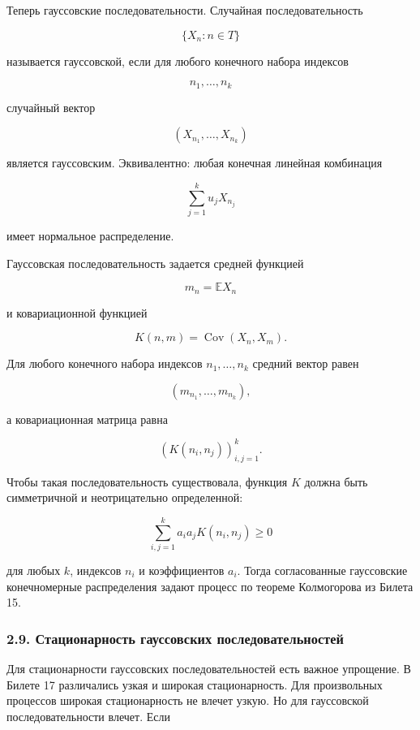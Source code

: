 \documentclass[
  11pt,
  a4paper,
]{article}
\begin{document}
Теперь гауссовские последовательности. Случайная последовательность

\[
\{X_n:n\in T\}
\]

называется гауссовской, если для любого конечного набора индексов

\[
n_1,\ldots,n_k
\]

случайный вектор

\[
(X_{n_1},\ldots,X_{n_k})
\]

является гауссовским. Эквивалентно: любая конечная линейная комбинация

\[
\sum_{j=1}^k u_jX_{n_j}
\]

имеет нормальное распределение.

Гауссовская последовательность задается средней функцией

\[
m_n=\mathbb EX_n
\]

и ковариационной функцией

\[
K(n,m)=\operatorname{Cov}(X_n,X_m).
\]

Для любого конечного набора индексов \(n_1,\ldots,n_k\) средний вектор
равен

\[
(m_{n_1},\ldots,m_{n_k}),
\]

а ковариационная матрица равна

\[
(K(n_i,n_j))_{i,j=1}^k.
\]

Чтобы такая последовательность существовала, функция \(K\) должна быть
симметричной и неотрицательно определенной:

\[
\sum_{i,j=1}^k a_i a_jK(n_i,n_j)\ge0
\]

для любых \(k\), индексов \(n_i\) и коэффициентов \(a_i\). Тогда
согласованные гауссовские конечномерные распределения задают процесс по
теореме Колмогорова из Билета 15.

\subsubsection{2.9. Стационарность гауссовских
последовательностей}\label{ux441ux442ux430ux446ux438ux43eux43dux430ux440ux43dux43eux441ux442ux44c-ux433ux430ux443ux441ux441ux43eux432ux441ux43aux438ux445-ux43fux43eux441ux43bux435ux434ux43eux432ux430ux442ux435ux43bux44cux43dux43eux441ux442ux435ux439}

Для стационарности гауссовских последовательностей есть важное
упрощение. В Билете 17 различались узкая и широкая стационарность. Для
произвольных процессов широкая стационарность не влечет узкую. Но для
гауссовской последовательности влечет. Если
\end{document}
